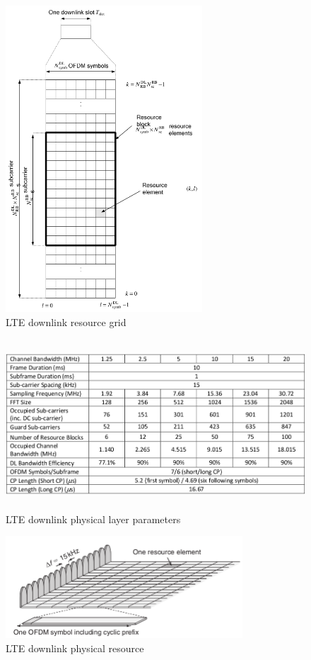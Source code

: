 \documentclass[titlepage]{article}
\numberwithin{figure}{section}
\numberwithin{equation}{section}
\begin{document}
\begin{figure}[htbp]\label{fig:res-grid}
	\centering
	\includegraphics[height=4.5in]{res-grid}
	\caption{LTE downlink resource grid\cite{36series-211}}
\end{figure}

\begin{figure}[htbp]\label{fig:phy-params}
	\centering
	\includegraphics[height=2.5in]{phy-params}
	\caption{LTE downlink physical layer parameters\cite{nutshell}}
\end{figure}

\begin{figure}[htbp]
	\centering
	\includegraphics[height=1.5in]{DL-PHY-RES}
	\caption{LTE downlink physical resource}
\end{figure}
\end{document}
